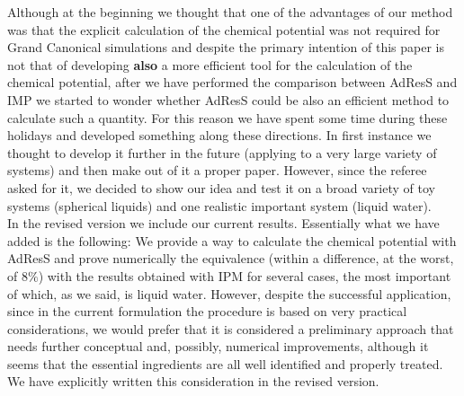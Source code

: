 \documentclass[12pt,a4paper]{article}
\begin{document}
Although at the beginning we thought that one of the advantages of our method was that the explicit calculation of the chemical potential was not required for  Grand Canonical simulations and despite the primary intention of this paper is not that of developing {\bf also} a more efficient tool for the calculation of the chemical potential, after we have performed the comparison between AdResS and IMP we started to wonder whether AdResS could be also an efficient method to calculate such a quantity.  For this reason we have spent some time during these holidays and developed something along these directions. In first instance we thought to develop it further in the future (applying to a very large variety of systems) and then make out of it a proper paper. However, since the referee asked for it, we decided to show our idea and test it on a broad variety of toy systems (spherical liquids) and one realistic important system (liquid water).\\
In the revised version we include our current results. Essentially what we have added is the following: We provide a way to calculate the chemical potential with AdResS and prove numerically the equivalence (within a difference, at the worst,  of $8\%$) with the results obtained with IPM for several cases, the most important of which, as we said, is liquid water. However, despite the successful application, since in the current formulation the procedure is based on very practical considerations, we would prefer that it is considered a preliminary approach that needs further conceptual and, possibly, numerical improvements, although it seems that the essential ingredients are all well identified and properly treated. We have explicitly written this consideration in the revised version.\\
\end{document}
